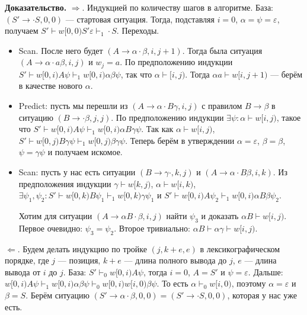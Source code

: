 \textbf{Доказательство.} $\Rightarrow$. Индукцией по количеству шагов в алгоритме. База: $(S' \to \cdot S, 0, 0)$ --- стартовая ситуация.
Тогда, подставляя $i = 0$, $\alpha = \psi = \varepsilon$, получаем $S' \vdash w[0,0) S' \varepsilon \vdash_1 \cdot S$.
Переходы.
\begin{itemize}
    \item Scan. После него будет $(A \to \alpha \cdot \beta, i, j + 1)$.
        Тогда была ситуация $(A \to \alpha \cdot a\beta, i, j)$ и $w_j = a$.
        По предположению индукции $S' \vdash w[0,i) A \psi \vdash_1 w[0,i) \alpha \beta \psi$, так что $\alpha \vdash[i,j)$.
        Тогда $\alpha a \vdash w[i,j + 1)$ --- берём в качестве нового $\alpha$.
    \item Predict: пусть мы перешли из $(A \to \alpha \cdot B \gamma, i, j)$ с правилом $B \to \beta$ в ситуацию $(B \to \cdot \beta, j, j)$.
        По предположению индукции $\exists \psi: \alpha \vdash w[i, j)$, такое что $S' \vdash w[0, i) A \psi \vdash_1 w[0, i) \alpha B \gamma \psi$.
        Так как $\alpha \vdash w[i, j)$, $S' \vdash w[0, j) B \gamma \psi \vdash_1 w[0, j) \beta \gamma \psi$.
        Теперь берём в утверждении $\alpha = \varepsilon$, $\beta = \beta$, $\psi = \gamma \psi$ и получаем искомое.
    \item Scan: пусть у нас есть ситуации $(B \to \gamma \cdot, k, j)$ и $(A \to \alpha \cdot B \beta, i, k)$.
        Из предположения индукции $\gamma \vdash w[k, j)$, $\alpha \vdash w[i, k)$, $\exists \psi_1, \psi_2: S' \vdash w[0, k) B \psi_1 \vdash_1 w[0, k) \gamma \psi_1$ и $S' \vdash w[0, i) A \psi_2 \vdash_1 w[0, i) \alpha B \beta \psi_2$.

        Хотим для ситуации $(A \to \alpha B \cdot \beta, i, j)$ найти $\psi_3$ и доказать $\alpha B \vdash w[i, j)$.
        Первое очевидно: $\psi_3 = \psi_2$.
        Второе тривиально: $\alpha B \vdash \alpha \gamma \vdash w[i, j)$.
        
\end{itemize}

$\Leftarrow$. Будем делать индукцию по тройке $(j, k + e, e)$ в лексикографическом порядке, где $j$ --- позиция, $k + e$ --- длина полного вывода до $j$, $e$ --- длина вывода от $i$ до $j$.
База: $S' \vdash_0 w[0,i) A \psi$, тогда $i = 0$, $A = S'$ и $\psi = \varepsilon$.
Дальше: $w[0,i) A \psi \vdash_1 w[0,i) \alpha \beta \psi \vdash_0 w[0,i) w[i,0) \beta \psi$.
То есть $\alpha \vdash_0 w[i,0)$, поэтому $\alpha = \varepsilon$ и $\beta = S$.
Берём ситуацию $(S' \to \alpha \cdot \beta, 0, 0) = (S' \to \cdot S, 0, 0)$, которая у нас уже есть.

